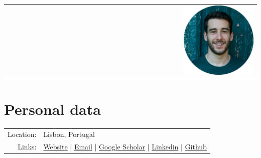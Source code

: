 \documentclass[a4paper,11pt]{article}
\begin{document}
  \pagestyle{empty}


  \begin{center}
    \begin{tabular}{lcr}
	    \par{\centering{\Huge Joaquim Campos}\bigskip\par} & & \includegraphics[width=0.3\textwidth]{../../images/Joaquim_circle.png} \\
    \end{tabular}
  \end{center}

  \vspace{16pt}

  \section{Personal data}

    \begin{tabular}{rl}
      Location: & Lisbon, Portugal \\
      Links: & \href{https://joaquimcampos.com}{Website} | \href{mailto:joaquimcampos@duck.com}{Email} | \href{https://scholar.google.com/citations?user=GT-VCroAAAAJ}{Google Scholar} |  \href{https://www.linkedin.com/in/joaquim-campos}{Linkedin} | \href{https://github.com/joaquimcampos/}{Github} \\
    \end{tabular}

\end{document}
